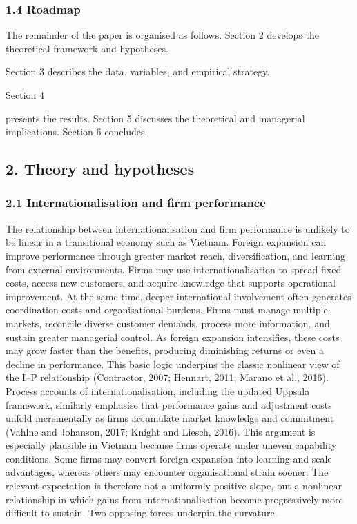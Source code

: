 \documentclass[12pt,a4paper]{article}
\begin{document}
\hypertarget{14-roadmap}{%
\subsubsection{1.4 Roadmap}\label{14-roadmap}}

The remainder of the paper is organised as follows. Section 2 develops
the theoretical framework and hypotheses.

Section 3 describes the data, variables, and empirical strategy.

Section 4

presents the results. Section 5 discusses the theoretical and managerial
implications. Section 6 concludes.

\hypertarget{2-theory-and-hypotheses}{%
\subsection{2. Theory and hypotheses}\label{2-theory-and-hypotheses}}

\hypertarget{21-internationalisation-and-firm-performance}{%
\subsubsection{2.1 Internationalisation and firm
performance}\label{21-internationalisation-and-firm-performance}}

The relationship between internationalisation and firm performance is
unlikely to be linear in a transitional economy such as Vietnam. Foreign
expansion can improve performance through greater market reach,
diversification, and learning from external environments. Firms may use
internationalisation to spread fixed costs, access new customers, and
acquire knowledge that supports operational improvement. At the same
time, deeper international involvement often generates coordination
costs and organisational burdens. Firms must manage multiple markets,
reconcile diverse customer demands, process more information, and
sustain greater managerial control. As foreign expansion intensifies,
these costs may grow faster than the benefits, producing diminishing
returns or even a decline in performance. This basic logic underpins the
classic nonlinear view of the I--P relationship (Contractor, 2007;
Hennart, 2011; Marano et al., 2016). Process accounts of
internationalisation, including the updated Uppsala framework, similarly
emphasise that performance gains and adjustment costs unfold
incrementally as firms accumulate market knowledge and commitment
(Vahlne and Johanson, 2017; Knight and Liesch, 2016). This argument is
especially plausible in Vietnam because firms operate under uneven
capability conditions. Some firms may convert foreign expansion into
learning and scale advantages, whereas others may encounter
organisational strain sooner. The relevant expectation is therefore not
a uniformly positive slope, but a nonlinear relationship in which gains
from internationalisation become progressively more difficult to
sustain. Two opposing forces underpin the curvature.
\end{document}
